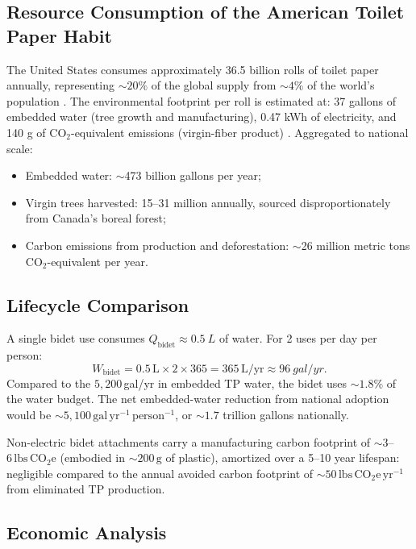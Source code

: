 \documentclass[aps,prfluids,reprint,amsmath,amssymb,floatfix]{revtex4-2}
\begin{document}
\subsection{Resource Consumption of the American Toilet Paper Habit}

The United States consumes approximately 36.5 billion rolls of toilet paper
annually, representing $\sim20\%$ of the global supply from $\sim4\%$ of
the world's population \citep{ScientificAmerican2009}. The environmental
footprint per roll is estimated at: 37 gallons of embedded water (tree growth
and manufacturing), 0.47 kWh of electricity, and 140 g of CO$_2$-equivalent
emissions (virgin-fiber product) \citep{NRDC2020}. Aggregated to national
scale:
\begin{itemize}[leftmargin=*]
    \item Embedded water: $\sim$473 billion gallons per year;
    \item Virgin trees harvested: 15--31 million annually, sourced
    disproportionately from Canada's boreal forest;
    \item Carbon emissions from production and deforestation:
    $\sim$26 million metric tons CO$_2$-equivalent per year.
\end{itemize}

\subsection{Lifecycle Comparison}

A single bidet use consumes $Q_\mathrm{bidet} \approx \SI{0.5}{L}$ of water.
For 2 uses per day per person:
\begin{equation}
    W_\mathrm{bidet} = 0.5\,\mathrm{L} \times 2 \times 365 = 365\,\mathrm{L/yr}
    \approx \SI{96}{gal/yr}.
\end{equation}
Compared to the $5{,}200$\,gal/yr in embedded TP water, the bidet uses
$\sim\!1.8\%$ of the water budget. The net embedded-water reduction from
national adoption would be $\sim\!5{,}100\,\mathrm{gal\,yr^{-1}\,person^{-1}}$,
or $\sim\!1.7$ trillion gallons nationally.

Non-electric bidet attachments carry a manufacturing carbon footprint of
$\sim\!3$--$6\,\mathrm{lbs\,CO_2e}$ (embodied in $\sim\!200\,\mathrm{g}$
of plastic), amortized over a 5--10 year lifespan: negligible compared to
the annual avoided carbon footprint of $\sim\!50\,\mathrm{lbs\,CO_2e\,yr^{-1}}$
from eliminated TP production.

\subsection{Economic Analysis}
\end{document}
